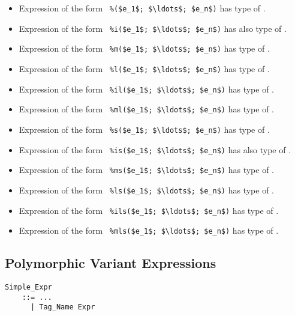 \begin{itemize}
  \item Expression of the form ~\lstinline!%($e_1$; $\ldots$; $e_n$)!
    has type of . 
  \item Expression of the form ~\lstinline!%i($e_1$; $\ldots$; $e_n$)!
    has also type of . 
  \item Expression of the form ~\lstinline!%m($e_1$; $\ldots$; $e_n$)!
    has type of .
  \item Expression of the form ~\lstinline!%l($e_1$; $\ldots$; $e_n$)!
    has type of . 
  \item Expression of the form ~\lstinline!%il($e_1$; $\ldots$; $e_n$)!
    has type of . 
  \item Expression of the form ~\lstinline!%ml($e_1$; $\ldots$; $e_n$)!
    has type of .
  \item Expression of the form ~\lstinline!%s($e_1$; $\ldots$; $e_n$)!
    has type of . 
  \item Expression of the form ~\lstinline[deletekeywords={is}]!%is($e_1$; $\ldots$; $e_n$)!
    has also type of . 
  \item Expression of the form ~\lstinline!%ms($e_1$; $\ldots$; $e_n$)!
    has type of .
  \item Expression of the form ~\lstinline!%ls($e_1$; $\ldots$; $e_n$)!
    has type of . 
  \item Expression of the form ~\lstinline!%ils($e_1$; $\ldots$; $e_n$)!
    has type of . 
  \item Expression of the form ~\lstinline!%mls($e_1$; $\ldots$; $e_n$)!
    has type of .
\end{itemize}





\subsection{Polymorphic Variant Expressions}
\label{sec:polymorphic-variant-expressions}

\grammar\begin{lstlisting}
Simple_Expr 
    ::= ...
      | Tag_Name Expr
\end{lstlisting}

